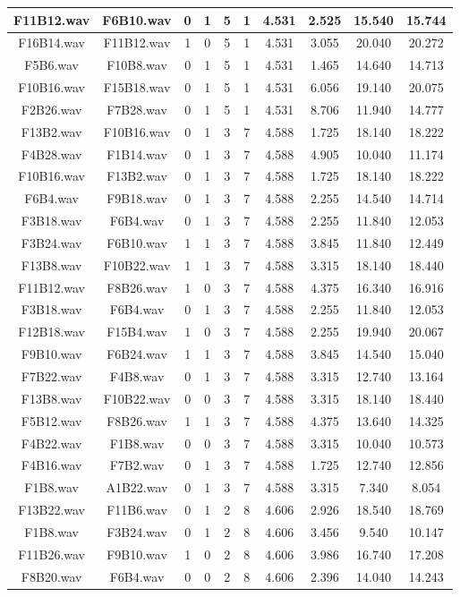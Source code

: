 \documentclass[11pt,a4paper]{book}
\begin{document}
\begin{longtable}[c]{|c|c|c|c|c|c|c|c|c|c|}
F11B12.wav&F6B10.wav&0&1&5&1&4.531&2.525&15.540&15.744\\ \hline
F16B14.wav&F11B12.wav&1&0&5&1&4.531&3.055&20.040&20.272\\ \hline
F5B6.wav&F10B8.wav&0&1&5&1&4.531&1.465&14.640&14.713\\ \hline
F10B16.wav&F15B18.wav&0&1&5&1&4.531&6.056&19.140&20.075\\ \hline
F2B26.wav&F7B28.wav&0&1&5&1&4.531&8.706&11.940&14.777\\ \hline
F13B2.wav&F10B16.wav&0&1&3&7&4.588&1.725&18.140&18.222\\ \hline
F4B28.wav&F1B14.wav&0&1&3&7&4.588&4.905&10.040&11.174\\ \hline
F10B16.wav&F13B2.wav&0&1&3&7&4.588&1.725&18.140&18.222\\ \hline
F6B4.wav&F9B18.wav&0&1&3&7&4.588&2.255&14.540&14.714\\ \hline
F3B18.wav&F6B4.wav&0&1&3&7&4.588&2.255&11.840&12.053\\ \hline
F3B24.wav&F6B10.wav&1&1&3&7&4.588&3.845&11.840&12.449\\ \hline
F13B8.wav&F10B22.wav&1&1&3&7&4.588&3.315&18.140&18.440\\ \hline
F11B12.wav&F8B26.wav&1&0&3&7&4.588&4.375&16.340&16.916\\ \hline
F3B18.wav&F6B4.wav&0&1&3&7&4.588&2.255&11.840&12.053\\ \hline
F12B18.wav&F15B4.wav&1&0&3&7&4.588&2.255&19.940&20.067\\ \hline
F9B10.wav&F6B24.wav&1&1&3&7&4.588&3.845&14.540&15.040\\ \hline
F7B22.wav&F4B8.wav&0&1&3&7&4.588&3.315&12.740&13.164\\ \hline
F13B8.wav&F10B22.wav&0&0&3&7&4.588&3.315&18.140&18.440\\ \hline
F5B12.wav&F8B26.wav&1&1&3&7&4.588&4.375&13.640&14.325\\ \hline
F4B22.wav&F1B8.wav&0&0&3&7&4.588&3.315&10.040&10.573\\ \hline
F4B16.wav&F7B2.wav&0&1&3&7&4.588&1.725&12.740&12.856\\ \hline
F1B8.wav&A1B22.wav&0&1&3&7&4.588&3.315&7.340&8.054\\ \hline
F13B22.wav&F11B6.wav&0&1&2&8&4.606&2.926&18.540&18.769\\ \hline
F1B8.wav&F3B24.wav&0&1&2&8&4.606&3.456&9.540&10.147\\ \hline
F11B26.wav&F9B10.wav&1&0&2&8&4.606&3.986&16.740&17.208\\ \hline
F8B20.wav&F6B4.wav&0&0&2&8&4.606&2.396&14.040&14.243\\ \hline

\end{longtable}
\end{document}
